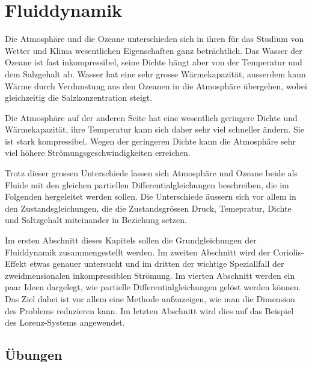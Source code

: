 %
%
%
\chapter{Fluiddynamik\label{chapter:fluiddynamik}}
\rhead{}
Die Atmosphäre und die Ozeane unterschieden sich in ihren
für das Studium von Wetter und Klima wesentlichen Eigenschaften
ganz beträchtlich.
Das Wasser der Ozeane ist fast inkompressibel, seine Dichte hängt aber
von der Temperatur und dem Salzgehalt ab.
Wasser hat eine sehr grosse Wärmekapazität, ausserdem kann Wärme durch
Verdunstung aus den Ozeanen in die Atmosphäre übergehen, wobei gleichzeitig
die Salzkonzentration steigt.

Die Atmosphäre auf der anderen Seite hat eine wesentlich geringere
Dichte und Wärmekapazität, ihre Temperatur kann sich daher sehr viel
schneller ändern.
Sie ist stark kompressibel.
Wegen der geringeren Dichte kann die Atmosphäre sehr viel höhere
Strömungsgeschwindigkeiten erreichen.

Trotz dieser grossen Unterschiede lassen sich Atmosphäre und Ozeane
beide als Fluide mit den gleichen partiellen Differentialgleichungen
beschreiben, die im Folgenden hergeleitet werden sollen.
Die Unterschiede äussern sich vor allem in den Zustandsgleichungen,
die die Zustandsgrössen Druck, Temepratur, Dichte und Saltzgehalt
miteinander in Beziehung setzen.

Im ersten Abschnitt dieses Kapitels sollen die Grundgleichungen
der Fluiddynamik zusammengestellt werden.
Im zweiten Abschnitt wird der Coriolis-Effekt etwas genauer 
untersucht und im dritten der wichtige Speziallfall der 
zweidmensionalen inkompressiblen Strömung.
Im vierten Abschnitt werden ein paar Ideen dargelegt, wie partielle
Differentialgleichungen gelöst werden können.
Das Ziel dabei ist vor allem eine Methode aufzuzeigen, wie man die
Dimension des Problems reduzieren kann.
Im letzten Abschnitt wird dies auf das Beispiel des Lorenz-Systems angewendet.








\section*{Übungen}
\begin{uebungsaufgaben}
\item

\item

\item

\end{uebungsaufgaben}


